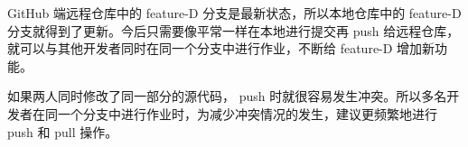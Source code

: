 \documentclass[12pt,a4paper]{article}
\begin{document}
GitHub 端远程仓库中的 feature-D 分支是最新状态，所以本地仓库中的 feature-D 分支就得到了更新。今后只需要像平常一样在本地进行提交再 push 给远程仓库，就可以与其他开发者同时在同一个分支中进行作业，不断给 feature-D 增加新功能。

如果两人同时修改了同一部分的源代码， push 时就很容易发生冲突。所以多名开发者在同一个分支中进行作业时，为减少冲突情况的发生，建议更频繁地进行 push 和 pull 操作。








\end{document}
